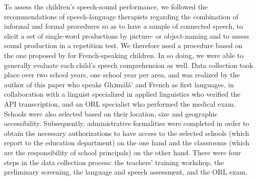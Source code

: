 \documentclass[output=paper,newtxmath,modfonts,nonflat,draftmode]{langsci/langscibook}
\begin{document}
To assess the children’s speech-sound performance, we followed the recommendations of speech-language therapists regarding the combination of informal and formal procedures so as to have a sample of connected speech, to elicit a set of single-word productions by picture- or object-naming and to assess sound production in a repetition test. We therefore used a procedure based on the one proposed by \citet{MaurinCherou1993} for French-speaking children. In so doing, we were able to generally evaluate each child’s speech comprehension as well. Data collection took place over two school years, one school year per area, and was realized by the author of this paper who speaks Ghɔmálá’ and French as first languages, in collaboration with a linguist specialized in applied linguistics who verified the API transcription, and an ORL specialist who performed the medical exam. Schools were also selected based on their location, size and geographic accessibility. Subsequently, administrative formalities were completed in order to obtain the necessary authorizations to have access to the selected schools (which report to the education department) on the one hand and the classrooms (which are the responsibility of school principals) on the other hand. There were four steps in the data collection process: the teachers’ training workshop, the preliminary screening, the language and speech assessment, and the ORL exam.
\end{document}
